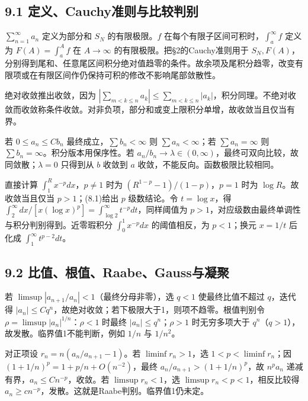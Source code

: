 \documentclass[11pt,a4paper]{article}
\begin{document}
\subsection{9.1
定义、Cauchy准则与比较判别}\label{ux5b9aux4e49cauchyux51c6ux5219ux4e0eux6bd4ux8f83ux5224ux522b}

\(\sum_{n=1}^\infty a_n\) 定义为部分和 \(S_N\) 的有限极限。\(f\)
在每个有限子区间可积时，\(\int_a^\infty f\) 定义为 \(F(A)=\int_a^Af\) 在
\(A\to\infty\) 的有限极限。把§2的Cauchy准则用于
\(S_N,F(A)\)，分别得到尾和、任意尾区间积分绝对值趋零的条件。故余项及尾积分趋零，改变有限项或在有限区间作仍保持可积的修改不影响尾部敛散性。

绝对收敛推出收敛，因为
\(|\sum_{m<k\le n}a_k|\le\sum_{m<k\le n}|a_k|\)，积分同理。不绝对收敛而收敛称条件收敛。对非负项，部分和或变上限积分单增，故收敛当且仅当有界。

若 \(0\le a_n\le Cb_n\) 最终成立，\(\sum b_n<\infty\) 则
\(\sum a_n<\infty\)；若 \(\sum a_n=\infty\) 则
\(\sum b_n=\infty\)。积分版本用保序性。若
\(a_n/b_n\to\lambda\in(0,\infty)\)，最终可双向比较，故同敛散；\(\lambda=0\)
只得到从 \(b\) 收敛到 \(a\) 收敛，不能反向。函数极限比较相同。

直接计算 \(\int_1^Rx^{-p}dx\)，\(p\ne1\) 时为
\((R^{1-p}-1)/(1-p)\)，\(p=1\) 时为 \(\log R\)。故收敛当且仅当
\(p>1\)；(8.1)给出 \(p\) 级数结论。令 \(t=\log x\)，得
\(\int_2^\infty dx/[x(\log x)^p]=\int_{\log2}^\infty t^{-p}dt\)，同样阈值为
\(p>1\)，对应级数由最终单调性与积分判别得到。近零瑕积分
\(\int_0^1x^{-p}dx\) 的阈值相反，为 \(p<1\)；换元 \(x=1/t\) 后化成
\(\int_1^\infty t^{p-2}dt\)。

\subsection{9.2
比值、根值、Raabe、Gauss与凝聚}\label{ux6bd4ux503cux6839ux503craabegaussux4e0eux51ddux805a}

若 \(\limsup|a_{n+1}/a_n|<1\)（最终分母非零），选 \(q<1\)
使最终比值不超过 \(q\)，迭代得
\(|a_n|\le Cq^n\)，故绝对收敛；若下极限大于1，则项不趋零。根值判别令
\(\rho=\limsup|a_n|^{1/n}\)：\(\rho<1\) 时最终
\(|a_n|\le q^n\)；\(\rho>1\) 时无穷多项大于
\(q^n\)（\(q>1\)），故发散。临界值1不能判断，例如 \(1/n\) 与 \(1/n^2\)。

对正项设 \(r_n=n(a_n/a_{n+1}-1)\)。若 \(\liminf r_n>1\)，选
\(1<p<\liminf r_n\)；因 \((1+1/n)^p=1+p/n+O(n^{-2})\)，最终
\(a_n/a_{n+1}>(1+1/n)^p\)，故 \(n^pa_n\)
递减有界，\(a_n\le Cn^{-p}\)，收敛。若 \(\limsup r_n<1\)，选
\(\limsup r_n<p<1\)，相反比较得
\(a_n\ge cn^{-p}\)，发散。这就是Raabe判别。临界值1仍未定。
\end{document}
